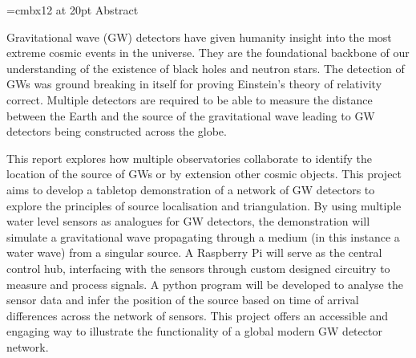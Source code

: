 \font\myfont=cmbx12 at 20pt
\Large
{\myfont Abstract}

Gravitational wave (GW) detectors have given humanity insight into the most extreme cosmic events in the universe. They are the foundational backbone of our understanding of the existence of black holes and neutron stars. The detection of GWs was ground breaking in itself for proving Einstein's theory of relativity correct. Multiple detectors are required to be able to measure the distance between the Earth and the source of the gravitational wave leading to GW detectors being constructed across the globe.

This report explores how multiple observatories collaborate to identify the location of the source of GWs or by extension other cosmic objects. This project aims to develop a tabletop demonstration of a network of GW detectors to explore the principles of source localisation and triangulation. By using multiple water level sensors as analogues for GW detectors, the demonstration will simulate a gravitational wave propagating through a medium (in this instance a water wave) from a singular source. A Raspberry Pi will serve as the central control hub, interfacing with the sensors through custom designed circuitry to measure and process signals. A python program will be developed to analyse the sensor data and infer the position of the source based on time of arrival differences across the network of sensors. This project offers an accessible and engaging way to illustrate the functionality of a global modern GW detector network.